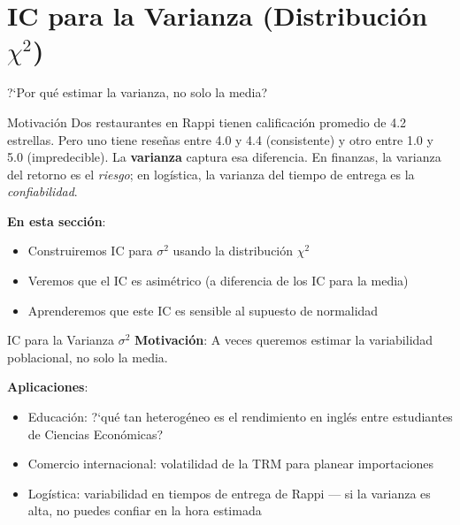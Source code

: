 \documentclass[aspectratio=169, 11pt]{beamer}
\begin{document}
\section{IC para la Varianza (Distribución $\chi^2$)}

\begin{frame}{?`Por qu\'e estimar la varianza, no solo la media?}
\begin{exampleblock}{Motivaci\'on}
Dos restaurantes en Rappi tienen calificaci\'on promedio de 4.2 estrellas. Pero uno tiene rese\~nas entre 4.0 y 4.4 (consistente) y otro entre 1.0 y 5.0 (impredecible). La \textbf{varianza} captura esa diferencia. En finanzas, la varianza del retorno es el \emph{riesgo}; en log\'istica, la varianza del tiempo de entrega es la \emph{confiabilidad}.
\end{exampleblock}

\textbf{En esta secci\'on}:
\begin{itemize}\setlength{\itemsep}{1pt}
  \item Construiremos IC para $\sigma^2$ usando la distribuci\'on $\chi^2$
  \item Veremos que el IC es \alert{asim\'etrico} (a diferencia de los IC para la media)
  \item Aprenderemos que este IC es \alert{sensible} al supuesto de normalidad
\end{itemize}
\end{frame}

\begin{frame}{IC para la Varianza $\sigma^2$}
\textbf{Motivaci\'on}: A veces queremos estimar la \alert{variabilidad} poblacional, no solo la media.

\vspace{0.3cm}
\textbf{Aplicaciones}:
\begin{itemize}
  \item Educaci\'on: ?`qu\'e tan heterog\'eneo es el rendimiento en ingl\'es entre estudiantes de Ciencias Econ\'omicas?
  \item Comercio internacional: volatilidad de la TRM para planear importaciones
  \item Log\'istica: variabilidad en tiempos de entrega de Rappi --- si la varianza es alta, no puedes confiar en la hora estimada
\end{itemize}
\end{frame}
\end{document}
